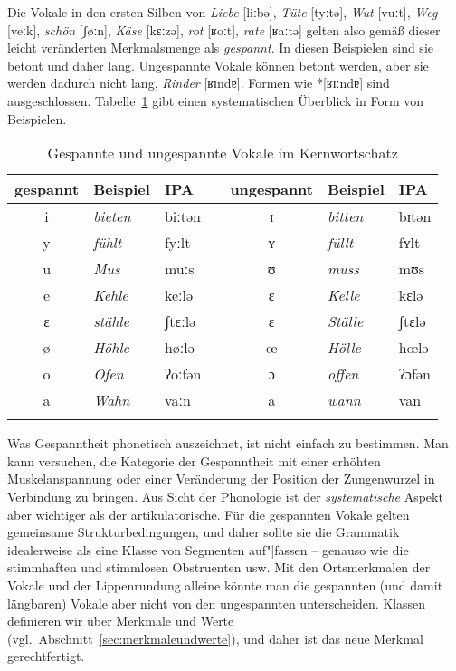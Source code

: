 Die Vokale in den ersten Silben von \textit{Liebe} [liːbə], \textit{Tüte} [tyːtə], \textit{Wut} [vuːt], \textit{Weg} [veːk], \textit{schön} [ʃøːn], \textit{Käse} [kɛːzə], \textit{rot} [ʁoːt], \textit{rate} [ʁaːtə] gelten also gemäß dieser leicht veränderten Merkmalsmenge als \textit{gespannt}.
In diesen Beispielen sind sie betont und daher lang.
Ungespannte Vokale können betont werden, aber sie werden dadurch nicht lang, \zB \textit{Rinder} [ʁɪndɐ].
Formen wie *[ʁɪːndɐ] sind ausgeschlossen.
Tabelle~\ref{tab:gespanntheitbetonungundlaenge020} gibt einen systematischen Überblick in Form von Beispielen.

\begin{table}[!htbp]
  \centering
  \begin{tabular}{cllp{0.25cm}cll}
    \lsptoprule
    \textbf{gespannt} & \textbf{Beispiel} & \textbf{IPA} & & \textbf{ungespannt} & \textbf{Beispiel} & \textbf{IPA} \\
    \midrule
    i  & \textit{bieten} & biːtən && ɪ & \textit{bitten}  & bɪtən   \\
    y  & \textit{fühlt}  & fyːlt  && ʏ & \textit{füllt}   & fʏlt    \\
    u  & \textit{Mus}    & muːs   && ʊ & \textit{muss}    & mʊs     \\
    e  & \textit{Kehle}  & keːlə  && ɛ & \textit{Kelle}   & kɛlə    \\
    ɛ  & \textit{stähle} & ʃtɛːlə && ɛ & \textit{Ställe}  & ʃtɛlə   \\
    ø & \textit{Höhle}  & høːlə && œ & \textit{Hölle} & hœlə \\
    o  & \textit{Ofen}   & ʔoːfən && ɔ & \textit{offen}   & ʔɔfən   \\
    a  & \textit{Wahn}   & vaːn   && a & \textit{wann}    & van     \\
    \lspbottomrule
  \end{tabular}
  \caption{Gespannte und ungespannte Vokale im Kernwortschatz}
  \label{tab:gespanntheitbetonungundlaenge020}
\end{table}

Was Gespanntheit phonetisch auszeichnet, ist nicht einfach zu bestimmen.
Man kann versuchen, die Kategorie der Gespanntheit mit einer erhöhten Muskelanspannung oder einer Veränderung der Position der Zungenwurzel in Verbindung zu bringen.
Aus Sicht der Phonologie ist der \textit{systematische} Aspekt aber wichtiger als der artikulatorische.
Für die gespannten Vokale gelten gemeinsame Strukturbedingungen, und daher sollte sie die Grammatik idealerweise als eine Klasse von Segmenten auf"|fassen -- genauso wie die stimmhaften und stimmlosen Obstruenten usw.
Mit den Ortsmerkmalen der Vokale und der Lippenrundung alleine könnte man die gespannten (und damit längbaren) Vokale aber nicht von den ungespannten unterscheiden.
Klassen definieren wir über Merkmale und Werte (vgl.\ Abschnitt~\ref{sec:merkmaleundwerte}), und daher ist das neue Merkmal gerechtfertigt.

